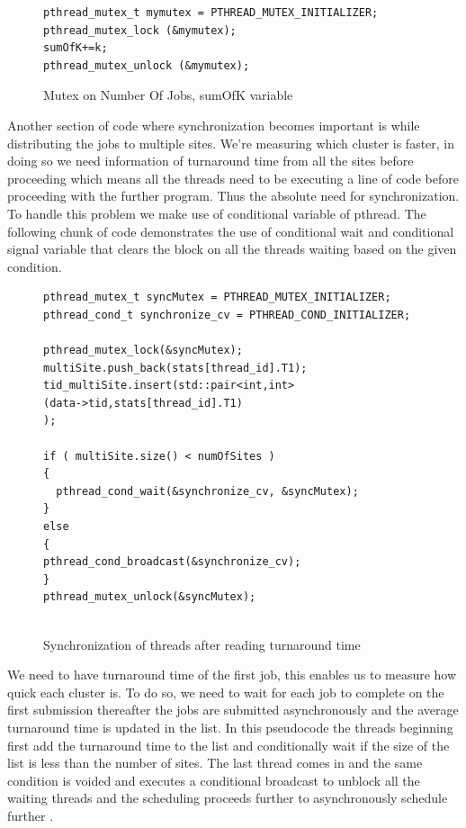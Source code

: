 \documentclass[ms,electronic,double]{nuthesis}
\begin{document}
\begin{figure}[htbp!]

\begin{lstlisting}
pthread_mutex_t mymutex = PTHREAD_MUTEX_INITIALIZER;
pthread_mutex_lock (&mymutex);
sumOfK+=k;
pthread_mutex_unlock (&mymutex);
\end{lstlisting}

\caption{Mutex on Number Of Jobs, sumOfK variable}
\label{fig:mutex}

\end{figure}


Another section of code where synchronization becomes important is while 
distributing the jobs to multiple sites. We're measuring which cluster is 
faster, in doing so we need information of turnaround time from all the sites 
before proceeding which means all the threads need to be executing a line of code 
before proceeding with the further program. Thus the absolute need for 
synchronization. To handle this problem we make use of conditional variable of 
pthread. The following chunk of code demonstrates the use of conditional wait 
and conditional signal variable that clears the block on all the threads waiting 
based on the given condition.


\begin{figure}[htbp!]

\begin{lstlisting}
pthread_mutex_t syncMutex = PTHREAD_MUTEX_INITIALIZER;
pthread_cond_t synchronize_cv = PTHREAD_COND_INITIALIZER;

pthread_mutex_lock(&syncMutex);    
multiSite.push_back(stats[thread_id].T1);	
tid_multiSite.insert(std::pair<int,int>
(data->tid,stats[thread_id].T1)
);
	   
if ( multiSite.size() < numOfSites )
{
  pthread_cond_wait(&synchronize_cv, &syncMutex);
}
else
{		
pthread_cond_broadcast(&synchronize_cv);
}
pthread_mutex_unlock(&syncMutex);
    
\end{lstlisting}
\caption{Synchronization of threads after reading turnaround time}
\label{fig:synchronization}
\end{figure}
\FloatBarrier

We need to have turnaround time of the first job,  this enables us to measure 
how quick each cluster is. To do so, we need to wait for each job to complete on 
the first submission thereafter the jobs are submitted asynchronously and the 
average turnaround time is updated in the list. In this pseudocode the threads 
beginning first add the turnaround time to the list and conditionally wait if 
the size of the list is less than the number of sites. The last thread comes in 
and the same condition is voided and executes a conditional broadcast to unblock 
all the waiting threads and the scheduling proceeds further to asynchronously schedule further 
.
\end{document}
